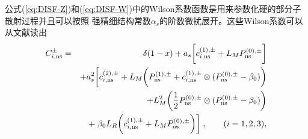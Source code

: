 公式(\ref{eq:DISF-Z})和(\ref{eq:DISF-W})中的Wilson系数函数是用来参数化硬的部分子散射过程并且可以按照
强精细结构常数$\alpha_s$的阶数微扰展开。这些Wilson系数可以从文献读出
\begin{eqnarray}
\label{eq:WF-NS-pm}
C^{\pm}_{i, {\rm ns}}
&=&
\delta(1-x)
+ a_s \biggl[ c_{i, {\rm ns}}^{(1), \pm} + L_M P_{{\rm ns}}^{(0), \pm} \biggr] \nonumber \\
&& +
a_s^2
\biggl[ c_{i, {\rm ns}}^{(2), \pm}
+ L_M
\biggl(
P_{{\rm ns}}^{(1), \pm} + c_{i, {\rm ns}}^{(1), \pm} \otimes (P_{{\rm ns}}^{(0), \pm} - \beta_0)
\biggr)
\nonumber \\
&&
+ L_M^2
\biggl(
\frac{1}{2} P_{{\rm ns}}^{(0), \pm} \otimes (P_{{\rm ns}}^{(0), \pm} - \beta_0)
\biggr)
\nonumber \\
&& +
\left.
\beta_0 L_R
\biggl( c_{i, {\rm ns}}^{(1), \pm} + L_M P_{{\rm ns}}^{(0), \pm} \biggr)
\biggr]
\right., \qquad (i = 1, 2, 3),
\end{eqnarray}

